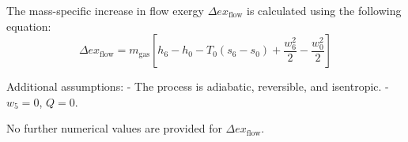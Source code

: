 The mass-specific increase in flow exergy \( \Delta ex_{\text{flow}} \) is calculated using the following equation:  
\[
\Delta ex_{\text{flow}} = m_{\text{gas}} \left[ h_6 - h_0 - T_0 (s_6 - s_0) + \frac{w_6^2}{2} - \frac{w_0^2}{2} \right]
\]  

Additional assumptions:  
- The process is adiabatic, reversible, and isentropic.  
- \( w_5 = 0 \), \( Q = 0 \).  

No further numerical values are provided for \( \Delta ex_{\text{flow}} \).